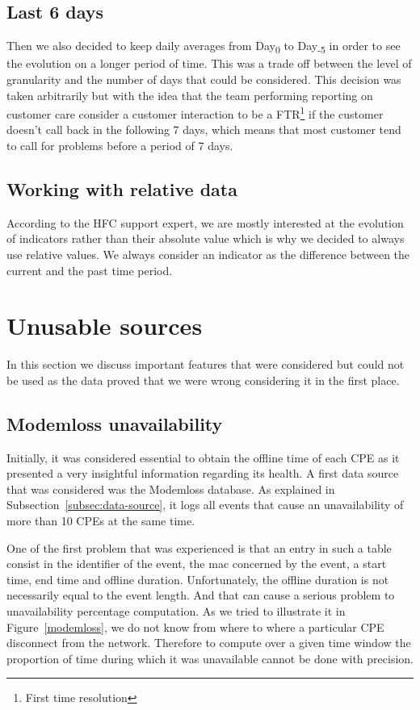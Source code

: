 \subsection{Last 6 days}
Then we also decided to keep daily averages from Day\textsubscript{0} to Day\textsubscript{-5} in order to see the evolution on a longer period of time. This was a trade off between the level of granularity and the number of days that could be considered. This decision was taken arbitrarily but with the idea that the team performing reporting on customer care consider a customer interaction to be a FTR\footnote{First time resolution} if the customer doesn't call back in the following 7 days, which means that most customer tend to call for problems before a period of 7 days.

\subsection{Working with relative data}
According to the HFC support expert, we are mostly interested at the evolution of indicators rather than their absolute value which is why we decided to always use relative values. We always consider an indicator as the difference between the current and the past time period. 

\section{Unusable sources}
In this section we discuss important features that were considered but could not be used as the data proved that we were wrong considering it in the first place.

\subsection{Modemloss unavailability}
Initially, it was considered essential to obtain the offline time of each CPE as it presented a very insightful information regarding its health. A first data source that was considered was the Modemloss database. As explained in Subsection~\ref{subsec:data-source}, it logs all events that cause an unavailability of more than 10 CPEs at the same time. 

One of the first problem that was experienced is that an entry in such a table consist in the identifier of the event, the mac concerned by the event, a start time, end time and offline duration. Unfortunately, the offline duration is not necessarily equal to the event length. And that can cause a serious problem to unavailability percentage computation. As we tried to illustrate it in Figure~\ref{modemloss}, we do not know from where to where a particular CPE disconnect from the network. Therefore to compute over a given time window the proportion of time during which it was unavailable cannot be done with precision. 

